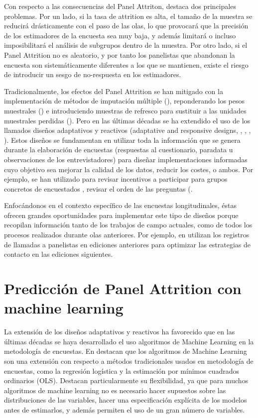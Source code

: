 Con respecto a las consecuencias del Panel Attriton, \cite{lynn2018tackling} destaca dos principales problemas. Por un lado, si la tasa de attrition es alta, el tamaño de la muestra se reducirá drásticamente con el paso de las olas, lo que provocará que la precisión de los estimadores de la encuesta sea muy baja, y además limitará o incluso imposibilitará el análisis de subgrupos dentro de la muestra. Por otro lado, si el Panel Attrition no es aleatorio, y por tanto los panelistas que abandonan la encuesta son sistemáticamente diferentes a los que se mantienen, existe el riesgo de introducir un sesgo de no-respuesta en los estimadores.

Tradicionalmente, los efectos del Panel Attrition se han mitigado con la implementación de métodos de imputación múltiple (\cite{rubin1987multiple}), reponderando los pesos muestrales (\cite{groves2009survey}) e introduciendo muestras de refresco para sustituir a las unidades muestrales perdidas (\cite{hirano1998combining}). Pero en las últimas décadas se ha extendido el uso de los llamados diseños adaptativos y reactivos (adaptative and responsive designs, \cite{groves2006responsive}, \cite{wagner2008adaptive}, \cite{schouten2017adaptive}, \cite{tourangeau2017adaptive}). Estos diseños se fundamentan en utilizar toda la información que se genera durante la elaboración de encuestas (respuestas al cuestionario, paradata u observaciones de los entrevistadores) para diseñar implementaciones informadas cuyo objetivo sea mejorar la calidad de los datos, reducir los costes, o ambos. Por ejemplo, se han utilizado para revisar incentivos a participar para grupos concretos de encuestados \cite{mcgonagle2022effects}, revisar el orden de las preguntas (\cite{early2017dynamic}.

Enfocándonos en el contexto específico de las encuestas longitudinales, éstas ofrecen grandes oportunidades para implementar este tipo de diseños porque recopilan información tanto de los trabajos de campo actuales, como de todos los procesos realizados durante olas anteriores. Por ejemplo, en \cite{kreuter2015note} utilizan los registros de llamadas a panelistas en ediciones anteriores para optimizar las estrategias de contacto en las ediciones siguientes.

\section{Predicción de Panel Attrition con machine learning}

La extensión de los diseños adaptativos y reactivos ha favorecido que en las últimas décadas se haya desarrollado el uso algoritmos de Machine Learning en la metodología de encuestas. En \cite{buskirk2018introduction} destacan que los algoritmos de Machine Learning son una extensión con respecto a métodos tradicionales usados en metodología de encuestas, como la regresión logística y la estimación por mínimos cuadrados ordinarios (OLS). Destacan particularmente su flexibilidad, ya que para muchos algoritmos de machine learning no es necesario hacer supuestos sobre las distribuciones de las variables, hacer una especificación explícita de los modelos antes de estimarlos, y además permiten el uso de un gran número de variables.



